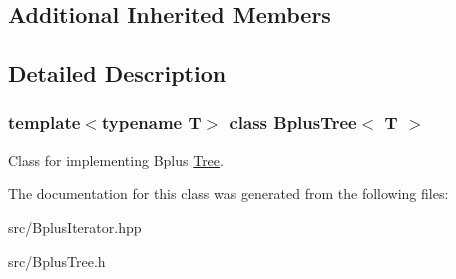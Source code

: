 \subsection*{Additional Inherited Members}


\subsection{Detailed Description}
\subsubsection*{template$<$typename T$>$\newline
class Bplus\+Tree$<$ T $>$}

Class for implementing Bplus \hyperlink{classTree}{Tree}. 

The documentation for this class was generated from the following files\+:\begin{DoxyCompactItemize}
\item 
src/Bplus\+Iterator.\+hpp\item 
src/Bplus\+Tree.\+h\end{DoxyCompactItemize}
